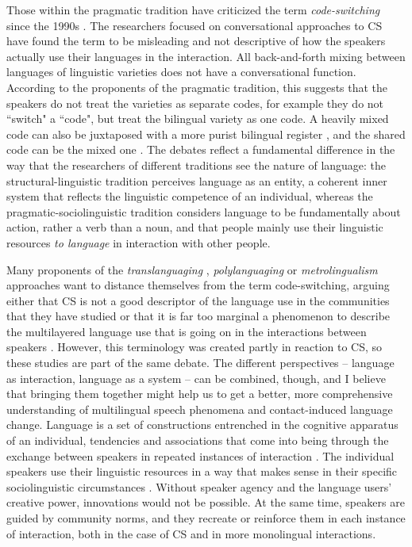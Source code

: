 \documentclass[output=paper,
modfonts
]{langscibook}
\begin{document}
Those within the pragmatic tradition have criticized the term \textit{code-switching} since the 1990s \parencite{auer1998code}. The researchers focused on conversational approaches to CS have found the term to be misleading and not descriptive of how the speakers actually use their languages in the interaction. All back-and-forth mixing between languages of linguistic varieties does not have a conversational function. According to the proponents of the pragmatic tradition, this suggests that the speakers do not treat the varieties as separate codes, for example they do not “switch" a “code", but treat the bilingual variety as one code. A heavily mixed code can also be juxtaposed with a more purist bilingual register \parencite{meeuwis1998monolectal}, and the shared code can be the mixed one \parencite{alvarez1998codeswitching}. The debates reflect a fundamental difference in the way that the researchers of different traditions see the nature of language: the structural-linguistic tradition perceives language as an entity, a coherent inner system that reflects the linguistic competence of an individual, whereas the pragmatic-sociolinguistic tradition considers language to be fundamentally about action, rather a verb than a noun, and that people mainly use their linguistic resources \textit{to language} in interaction with other people.

Many proponents of the \textit{translanguaging }\parencite{garcia2009education,creese2010translanguaging, garcia2014translanguaging}, \textit{polylanguaging} \parencite{jorgensen2011polylanguaging} or \textit{metrolingualism }\parencite{otsuji2010metrolingualism} approaches want to distance themselves from the term code-switching, arguing either that CS is not a good descriptor of the language use in the communities that they have studied \parencite{jorgensen2011polylanguaging} or that it is far too marginal a phenomenon to describe the multilayered language use that is going on in the interactions between speakers \parencite{garcia2014translanguaging}. However, this terminology was created partly in reaction to CS, so these studies are part of the same debate. The different perspectives – language as interaction, language as a system – can be combined, though, and I believe that bringing them together might help us to get a better, more comprehensive understanding of multilingual speech phenomena and contact-induced language change. Language is a set of constructions entrenched in the cognitive apparatus of an individual, tendencies and associations that come into being through the exchange between speakers in repeated instances of interaction \parencite{beckner2009language, backus2013usage}. The individual speakers use their linguistic resources in a way that makes sense in their specific sociolinguistic circumstances \parencite{heller2007bilingualism}. Without speaker agency and the language users’ creative power, innovations would not be possible. At the same time, speakers are guided by community norms, and they recreate or reinforce them in each instance of interaction, both in the case of CS and in more monolingual interactions.
\end{document}
